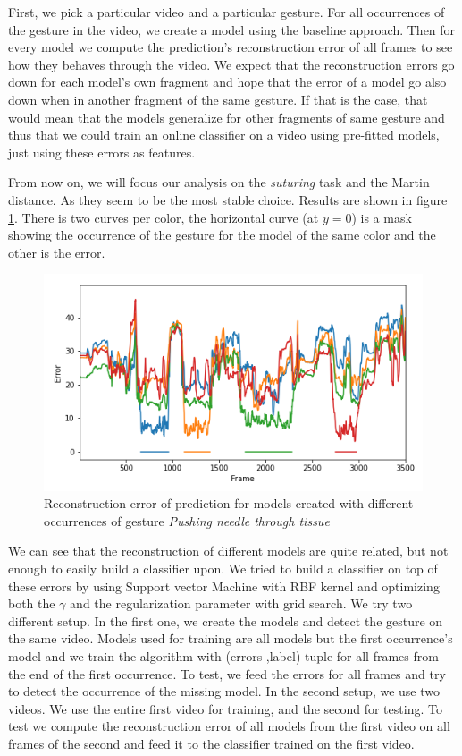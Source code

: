\documentclass[twocolumn,10pt]{asme2ej}
\begin{document}
First, we pick a particular video and a particular gesture. For all occurrences of the gesture in the video, we create a model using the baseline approach. Then for every model we compute the prediction's reconstruction error of all frames to see how they behaves through the video. We expect that the reconstruction errors go down for each model's own fragment and hope that the error of a model go also down when in another fragment of the same gesture. If that is the case, that would mean that the models generalize for other fragments of same gesture and thus that we could train an online classifier on a video using pre-fitted models, just using these errors as features.

From now on, we will focus our analysis on the \textit{suturing} task and the Martin distance. As they seem to be the most stable choice. Results are shown in figure \ref{fig:pred-error-jigsaws}. There is two curves per color, the horizontal curve (at $y=0$) is a mask showing the occurrence of the gesture for the model of the same color and the other is the error.

\begin{figure}[h]
    \centering
    \includegraphics[width=\columnwidth]{prediction_error_models_jigsaws_Suturing_B_trial1_g3.png}
    \caption{Reconstruction error of prediction for models created with different occurrences of gesture \textit{Pushing needle through tissue}}
    \label{fig:pred-error-jigsaws}
\end{figure}

We can see that the reconstruction of different models are quite related, but not enough to easily build a classifier upon. We tried to build a classifier on top of these errors by using Support vector Machine with RBF kernel and optimizing both the $\gamma$ and the regularization parameter with grid search. We try two different setup. In the first one, we create the models and detect the gesture on the same video. Models used for training are all models but the first occurrence's model and we train the algorithm with (errors ,label) tuple for all frames from the end of the first occurrence. To test, we feed the errors for all frames and try to detect the occurrence of the missing model. In the second setup, we use two videos. We use the entire first video for training, and the second for testing. To test we compute the reconstruction error of all models from the first video on all frames of the second and feed it to the classifier trained on the first video.
\end{document}
